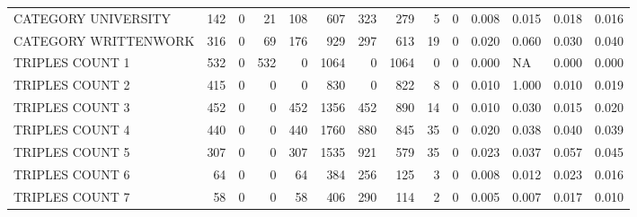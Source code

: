 \begin{tabular}{lrrrrrrrrrllll}
 CATEGORY UNIVERSITY      &             142 &             0 &              21 &             108 &             607 &  323 &  279 &    5 &    0 & 0.008 & 0.015 & 0.018 & 0.016 \\
 CATEGORY WRITTENWORK     &             316 &             0 &              69 &             176 &             929 &  297 &  613 &   19 &    0 & 0.020 & 0.060 & 0.030 & 0.040 \\
 TRIPLES COUNT 1          &             532 &             0 &             532 &               0 &            1064 &    0 & 1064 &    0 &    0 & 0.000 & NA    & 0.000 & 0.000 \\
 TRIPLES COUNT 2          &             415 &             0 &               0 &               0 &             830 &    0 &  822 &    8 &    0 & 0.010 & 1.000 & 0.010 & 0.019 \\
 TRIPLES COUNT 3          &             452 &             0 &               0 &             452 &            1356 &  452 &  890 &   14 &    0 & 0.010 & 0.030 & 0.015 & 0.020 \\
 TRIPLES COUNT 4          &             440 &             0 &               0 &             440 &            1760 &  880 &  845 &   35 &    0 & 0.020 & 0.038 & 0.040 & 0.039 \\
 TRIPLES COUNT 5          &             307 &             0 &               0 &             307 &            1535 &  921 &  579 &   35 &    0 & 0.023 & 0.037 & 0.057 & 0.045 \\
 TRIPLES COUNT 6          &              64 &             0 &               0 &              64 &             384 &  256 &  125 &    3 &    0 & 0.008 & 0.012 & 0.023 & 0.016 \\
 TRIPLES COUNT 7          &              58 &             0 &               0 &              58 &             406 &  290 &  114 &    2 &    0 & 0.005 & 0.007 & 0.017 & 0.010 \\
\hline
\end{tabular}